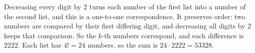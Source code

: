 Decreasing every digit by $2$ turns each number of the first list into a number of the second list, and this is a one-to-one correspondence. It preserves order: two numbers are compared by their first differing digit, and decreasing all digits by $2$ keeps that comparison. So the $k$-th numbers correspond, and each difference is $2222$. Each list has $4!=24$ numbers, so the sum is $24\cdot2222=\boxed{53328}$.
